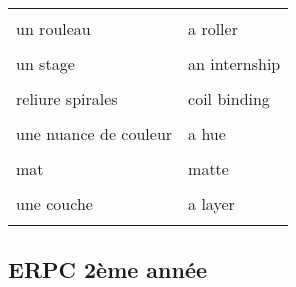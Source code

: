 \documentclass[
  10pt,
]{article}
\begin{document}
\begin{longtable}{ll}
\cellcolor{gray!6}{un pli} & \cellcolor{gray!6}{a fold}\\

un rouleau & a roller\\

\cellcolor{gray!6}{un sondage} & \cellcolor{gray!6}{a poll}\\

un stage & an internship\\

\cellcolor{gray!6}{piqûre à cheval} & \cellcolor{gray!6}{saddle-stitching}\\

reliure spirales & coil binding\\

\cellcolor{gray!6}{expédier qqch} & \cellcolor{gray!6}{to ship out stg}\\

une nuance de couleur & a hue\\

\cellcolor{gray!6}{délavé} & \cellcolor{gray!6}{washed out}\\

mat & matte\\

\cellcolor{gray!6}{brillant} & \cellcolor{gray!6}{glossy}\\

une couche & a layer\\
\cellcolor{gray!6}{mélanger} & \cellcolor{gray!6}{to mix}\\
\bottomrule
\end{longtable}

\hypertarget{erpc-2uxe8me-annuxe9e}{%
\subsection{ERPC 2ème année}\label{erpc-2uxe8me-annuxe9e}}
\end{document}
